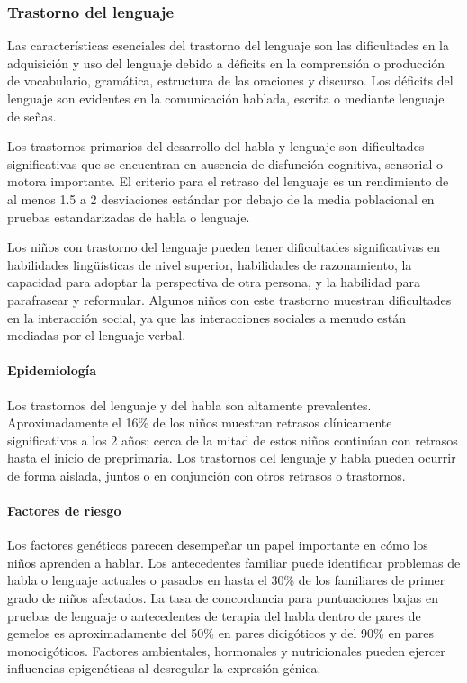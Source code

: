 \documentclass[11pt,letterpaper]{report}
\begin{document}
\subsubsection{Trastorno del lenguaje}
Las características esenciales del trastorno del lenguaje son las dificultades
en la adquisición y uso del lenguaje debido a déficits en la comprensión o
producción de vocabulario, gramática, estructura de las oraciones y discurso.
Los déficits del lenguaje son evidentes en la comunicación hablada, escrita o
mediante lenguaje de señas. \cite{DSM5TR}

Los trastornos primarios del desarrollo del habla y lenguaje son dificultades
significativas que se encuentran en ausencia de disfunción cognitiva, sensorial
o motora importante. El criterio para el retraso del lenguaje es un rendimiento
de al menos 1.5 a 2 desviaciones estándar por debajo de la media poblacional en
pruebas estandarizadas de habla o lenguaje. \cite{Feldman44}

Los niños con trastorno del lenguaje pueden tener dificultades significativas
en habilidades lingüísticas de nivel superior, habilidades de razonamiento, la
capacidad para adoptar la perspectiva de otra persona, y la habilidad para
parafrasear y reformular. Algunos niños con este trastorno muestran dificultades
en la interacción social, ya que las interacciones sociales a menudo están
mediadas por el lenguaje verbal. \cite{Nelson53}

\paragraph{Epidemiología}
Los trastornos del lenguaje y del habla son altamente prevalentes.
Aproximadamente el 16\% de los niños muestran retrasos clínicamente
significativos a los 2 años; cerca de la mitad de estos niños continúan
con retrasos hasta el inicio de preprimaria. Los trastornos del lenguaje y habla
pueden ocurrir de forma aislada, juntos o en conjunción con otros retrasos o
trastornos. \cite{Feldman44}

\paragraph{Factores de riesgo}
Los factores genéticos parecen desempeñar un papel importante en cómo los niños
aprenden a hablar. Los antecedentes familiar puede identificar problemas de
habla o lenguaje actuales o pasados en hasta el 30\% de los familiares de
primer grado de niños afectados. La tasa de concordancia para puntuaciones
bajas en pruebas de lenguaje o antecedentes de terapia del habla dentro de
pares de gemelos es aproximadamente del 50\% en pares dicigóticos y del 90\%
en pares monocigóticos. Factores ambientales, hormonales y nutricionales pueden
ejercer influencias epigenéticas al desregular la expresión génica.
\cite{Nelson53}
\end{document}
